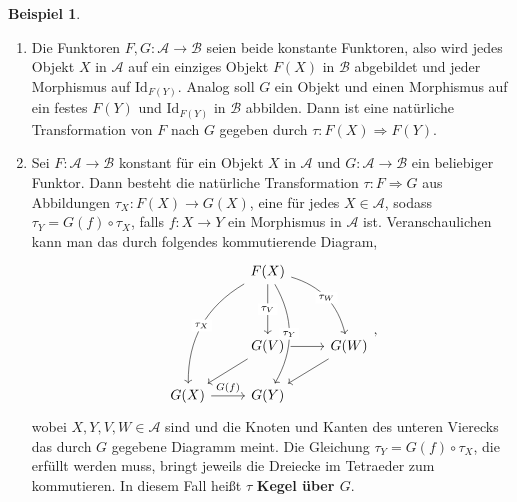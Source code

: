 \documentclass{article}
\theoremstyle{plain}
\theoremstyle{definition}
\newtheorem{exmp}{Beispiel}[section]
\theoremstyle{remark}
\begin{document}
\begin{exmp}
\begin{enumerate}
	\item Die Funktoren $F,G: \mathcal{A} \rightarrow \mathcal{B}$ seien beide konstante Funktoren, also wird jedes Objekt $X$ in $\mathcal{A}$ auf ein einziges Objekt $F(X)$ in $\mathcal{B}$ abgebildet und jeder Morphismus auf $\text{Id}_{F(Y)}$. Analog soll $G$ ein Objekt und einen Morphismus auf ein festes $F(Y)$ und $\text{Id}_{F(Y)}$ in $\mathcal{B}$ abbilden. Dann ist eine natürliche Transformation von $F$ nach $G$ gegeben durch $\tau: F(X) \Longrightarrow F(Y)$.
	\item Sei $F: \mathcal{A} \rightarrow \mathcal{B}$ konstant für ein Objekt $X$ in $\mathcal{A}$ und $G: \mathcal{A} \rightarrow \mathcal{B}$ ein beliebiger Funktor. Dann besteht die natürliche Transformation $\tau: F \Longrightarrow G$ aus Abbildungen $\tau_{X}: F(X) \rightarrow G(X)$, eine für jedes $X \in \mathcal{A}$, sodass $\tau_Y = G(f) \circ \tau_X$, falls $f:X \rightarrow Y$ ein Morphismus in $\mathcal{A}$ ist. Veranschaulichen kann man das durch folgendes kommutierende Diagram, 
	\begin{equation}
		\begin{tikzcd}
		               & F(X) \arrow[lddd, "\tau_X" description, bend right] \arrow[dd, "\tau_V" description] \arrow[rdd, "\tau_W" description, bend left] \arrow[ddd, "\tau_Y" description, bend left] &                 \\
		               &                                                                                                                                                                             &                 \\
		               & G(V) \arrow[r] \arrow[ld]                                                                                                                                                   & G(W) \arrow[ld] \\
		G(X) \arrow[r, "G(f)"] & G(Y)                                                                                                                                                                        &                
		\end{tikzcd},
	\end{equation}
	wobei $X,Y,V,W \in \mathcal{A}$ sind und die Knoten und Kanten des unteren Vierecks das durch $G$ gegebene Diagramm meint. Die Gleichung $\tau_Y = G(f) \circ \tau_X$, die erfüllt werden muss, bringt jeweils die Dreiecke im Tetraeder zum kommutieren. In diesem Fall heißt $\tau$ \textbf{Kegel über $G$}.

\end{enumerate}
\end{exmp}
\end{document}
